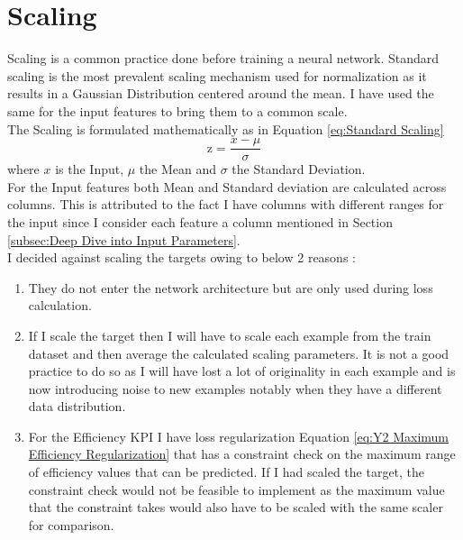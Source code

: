 \documentclass{report} %
\begin{document}
\section{Scaling}\label{sec:Scaling}

Scaling is a common practice done before training a neural network. 
Standard scaling is the most prevalent scaling mechanism used for normalization as it results in a Gaussian Distribution centered around the mean.
I have used the same for the input features to bring them to a common scale. \\

The Scaling is formulated mathematically as in Equation \ref{eq:Standard Scaling}
\begin{equation}
    \text{z} = \frac{x - \mu}{\sigma}
    \label{eq:Standard Scaling}
\end{equation} 
where $x$ is the Input, $\mu$ the Mean and $\sigma$ the Standard Deviation.\\
For the Input features both Mean and Standard deviation are calculated across columns. 
This is attributed to the fact I have columns with different ranges for the input since I consider each feature a column mentioned in 
Section \ref{subsec:Deep Dive into Input Parameters}.\\

I decided against scaling the targets owing to below 2 reasons :
\begin{enumerate}[nosep]
    \item They do not enter the network architecture but are only used during loss calculation.
    \item If I scale the target then I will have to scale each example from the train dataset and then average the calculated scaling parameters.
    It is not a good practice to do so as I will have lost a lot of originality in each example and is now introducing noise to new examples notably when they have a different data distribution.
    \item For the Efficiency \ac{KPI} I have loss regularization Equation \ref{eq:Y2 Maximum Efficiency Regularization} that has a constraint 
    check on the maximum range of efficiency values that can be predicted. If I had scaled the target, the constraint check would not be feasible to 
    implement as the maximum value that the constraint takes would also have to be scaled with the same scaler for comparison.\\
\end{enumerate}
\end{document}
